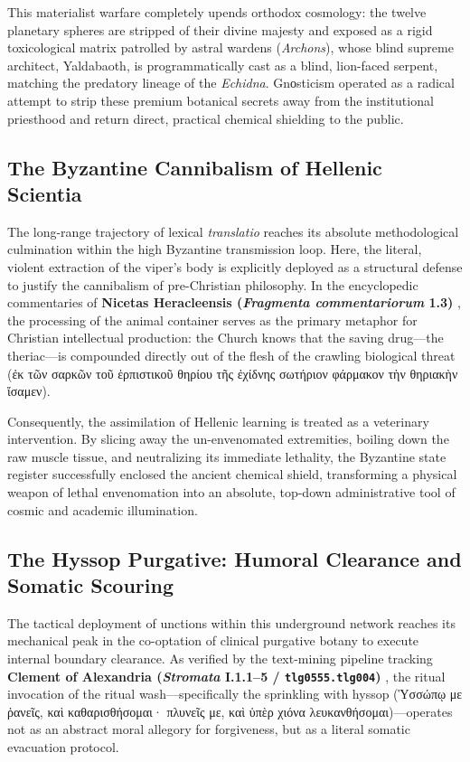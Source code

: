 \documentclass[11pt,twoside,a4paper]{article}
\begin{document}
This materialist warfare completely upends orthodox cosmology: the twelve planetary spheres are stripped of their divine majesty and exposed as a rigid toxicological matrix patrolled by astral wardens (\textit{Archons}), whose blind supreme architect, Yaldabaoth, is programmatically cast as a blind, lion-faced serpent, matching the predatory lineage of the \textit{Echidna}. Gnοsticism operated as a radical attempt to strip these premium botanical secrets away from the institutional priesthood and return direct, practical chemical shielding to the public.

\subsection{The Byzantine Cannibalism of Hellenic Scientia}
The long-range trajectory of lexical \textit{translatio} reaches its absolute methodological culmination within the high Byzantine transmission loop. Here, the literal, violent extraction of the viper’s body is explicitly deployed as a structural defense to justify the cannibalism of pre-Christian philosophy. In the encyclopedic commentaries of \textbf{Nicetas Heracleensis (\textit{Fragmenta commentariorum} 1.3)} \cite{nicetas1902gcs}, the processing of the animal container serves as the primary metaphor for Christian intellectual production: the Church knows that the saving drug—the theriac—is compounded directly out of the flesh of the crawling biological threat (\textgreek{ἐκ τῶν σαρκῶν τοῦ ἑρπιστικοῦ θηρίου τῆς ἐχίδνης σωτήριον φάρμακον τὴν θηριακὴν ἴσαμεν}). 

Consequently, the assimilation of Hellenic learning is treated as a veterinary intervention. By slicing away the un-envenomated extremities, boiling down the raw muscle tissue, and neutralizing its immediate lethality, the Byzantine state register successfully enclosed the ancient chemical shield, transforming a physical weapon of lethal envenomation into an absolute, top-down administrative tool of cosmic and academic illumination.

\subsection{The Hyssop Purgative: Humoral Clearance and Somatic Scouring}
The tactical deployment of unctions within this underground network reaches its mechanical peak in the co-optation of clinical purgative botany to execute internal boundary clearance. As verified by the text-mining pipeline tracking \textbf{Clement of Alexandria (\textit{Stromata} I.1.1--5 / \texttt{tlg0555.tlg004})} \cite{stahlin1906clement}, the ritual invocation of the ritual wash—specifically the sprinkling with hyssop (\textgreek{Ὑσσώπῳ με ῥανεῖς, καὶ καθαρισθήσομαι· πλυνεῖς με, καὶ ὑπὲρ χιόνα λευκανθήσομαι})—operates not as an abstract moral allegory for forgiveness, but as a literal somatic evacuation protocol. 
\end{document}

